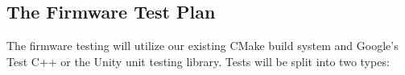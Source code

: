 \subsection{The Firmware Test Plan}
The firmware testing will utilize our existing CMake build system and Google's
Test C++ or the Unity unit testing library. Tests will be split into two types:


